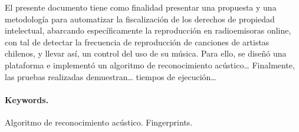
El presente documento tiene como finalidad presentar una propuesta y una metodología para automatizar la fiscalización de los derechos de propiedad intelectual, abarcando específicamente la reproducción en radioemisoras online, con tal de detectar la frecuencia de reproducción de canciones de artistas chilenos, y llevar así, un control del uso de su música. Para ello, se diseñó una plataforma e implementó un algoritmo de reconocimiento acústico… Finalmente, las pruebas realizadas demuestran… tiempos de ejecución…


\vspace{20mm}

\paragraph{Keywords.}
Algoritmo de reconocimiento acústico. Fingerprints.


\newpage\null\thispagestyle{empty}\newpage

